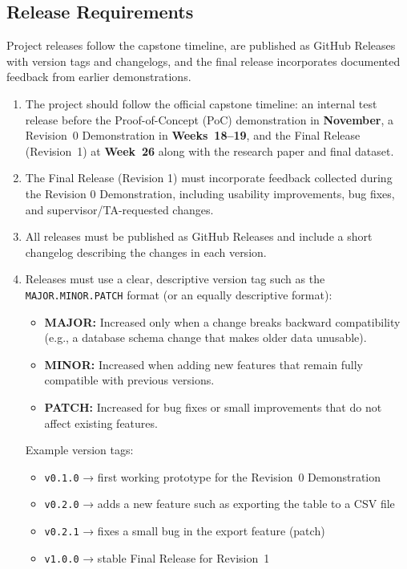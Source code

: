 \documentclass[12pt]{article}
\begin{document}
\subsection{Release Requirements}
Project releases follow the capstone timeline, are published as GitHub Releases with version tags and changelogs, and the final release incorporates documented feedback from earlier demonstrations.
\begin{enumerate}[label=OE-RR\arabic*]
\item The project should follow the official capstone timeline: an internal test release before the Proof-of-Concept (PoC) demonstration in \textbf{November}, a Revision~0 Demonstration in \textbf{Weeks~18--19}, and the Final Release (Revision~1) at \textbf{Week~26} along with the research paper and final dataset.
\item The Final Release (Revision 1) must incorporate feedback collected during the Revision 0 Demonstration, including usability improvements, bug fixes, and supervisor/TA-requested changes.
\item All releases must be published as GitHub Releases and include a short changelog describing the changes in each version.

  \item Releases must use a clear, descriptive version tag such as the \texttt{MAJOR.MINOR.PATCH} format (or an equally descriptive format):
    \begin{itemize}
        \item \textbf{MAJOR:} Increased only when a change breaks backward compatibility (e.g., a database schema change that makes older data unusable).
        \item \textbf{MINOR:} Increased when adding new features that remain fully compatible with previous versions.
        \item \textbf{PATCH:} Increased for bug fixes or small improvements that do not affect existing features.
    \end{itemize}

  Example version tags:
    \begin{itemize}
        \item \texttt{v0.1.0} → first working prototype for the Revision~0 Demonstration
        \item \texttt{v0.2.0} → adds a new feature such as exporting the table to a CSV file
        \item \texttt{v0.2.1} → fixes a small bug in the export feature (patch)
        \item \texttt{v1.0.0} → stable Final Release for Revision~1
    \end{itemize}
\end{enumerate}
\end{document}
